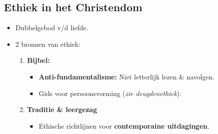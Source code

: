 \subsection*{Ethiek in het Christendom}
\begin{itemize}
	\item Dubbelgebod v/d liefde.
	\item 2 bronnen van ethiek:
	\begin{enumerate}
		\item \textbf{Bijbel:}
		\begin{itemize}
			\item \textbf{Anti-fundamentalisme:} Niet letterlijk lezen \& navolgen.
			\item Gids voor persoonsvorming (\textit{zie deugdenethiek}).
		\end{itemize}
		\item \textbf{Traditie \& leergezag}
		\begin{itemize}
			\item Ethische richtlijnen voor \textbf{contemporaine uitdagingen}.
		\end{itemize}
	\end{enumerate}
\end{itemize}